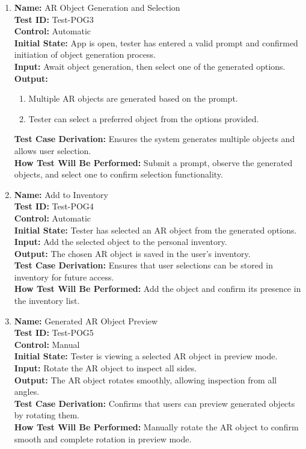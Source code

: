 \documentclass[12pt, titlepage]{article}
\begin{document}
\begin{enumerate}
  \item \textbf{Name:} AR Object Generation and Selection \label{itm:Test-POG3} \\
  \textbf{Test ID:} Test-POG3 \\
  \textbf{Control:} Automatic \\
  \textbf{Initial State:} App is open, tester has entered a valid prompt and confirmed initiation of object generation process. \\
  \textbf{Input:} Await object generation, then select one of the generated options. \\
  \textbf{Output:}
      \begin{enumerate}
          \item Multiple AR objects are generated based on the prompt.
          \item Tester can select a preferred object from the options provided.
      \end{enumerate}
  \textbf{Test Case Derivation:} Ensures the system generates multiple objects and allows user selection. \\
  \textbf{How Test Will Be Performed:} Submit a prompt, observe the generated objects, and select one to confirm selection functionality. \\

  \item \textbf{Name:} Add to Inventory \label{itm:Test-POG4} \\
  \textbf{Test ID:} Test-POG4 \\
  \textbf{Control:} Automatic \\
  \textbf{Initial State:} Tester has selected an AR object from the generated options. \\
  \textbf{Input:} Add the selected object to the personal inventory. \\
  \textbf{Output:} The chosen AR object is saved in the user's inventory. \\
  \textbf{Test Case Derivation:} Ensures that user selections can be stored in inventory for future access. \\
  \textbf{How Test Will Be Performed:} Add the object and confirm its presence in the inventory list. \\

  \item \textbf{Name:} Generated AR Object Preview \label{itm:Test-POG5} \\
  \textbf{Test ID:} Test-POG5 \\
  \textbf{Control:} Manual \\
  \textbf{Initial State:} Tester is viewing a selected AR object in preview mode. \\
  \textbf{Input:} Rotate the AR object to inspect all sides. \\
  \textbf{Output:} The AR object rotates smoothly, allowing inspection from all angles. \\
  \textbf{Test Case Derivation:} Confirms that users can preview generated objects by rotating them. \\
  \textbf{How Test Will Be Performed:} Manually rotate the AR object to confirm smooth and complete rotation in preview mode. \\


\end{enumerate}
\end{document}
